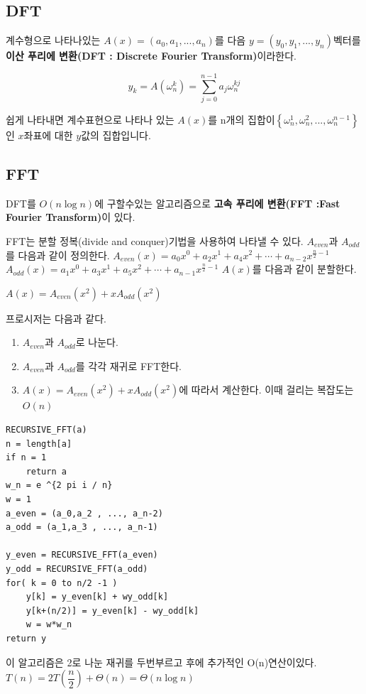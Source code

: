 \subsection{DFT}

계수형으로 나타나있는 $A(x) = (a_0,a_1,...,a_n)$를 다음 $y = (y_0,y_1,...,y_n) $벡터를 \textbf{이산 푸리에 변환(DFT : Discrete Fourier Transform)}이라한다.

$$ y_k = A(\omega^k_n) = \sum_{j=0}^{n-1} a_j\omega_{n}^{kj}$$

쉽게 나타내면 계수표현으로 나타나 있는 $A(x)$를 n개의 집합이$\left\{\omega_n^1, \omega_n^2 , ... , \omega_n^{n-1}\right\}$인 $x$좌표에 대한 $y$값의 집합입니다.

\subsection{FFT}
DFT를 $O(n \log n)$에 구할수있는 알고리즘으로 \textbf{고속 푸리에 변환(FFT :Fast Fourier Transform)}이 있다. 

FFT는 분할 정복(divide and conquer)기법을 사용하여 나타낼 수 있다.
$A_{even}$과 $A_{odd}$를 다음과 같이 정의한다.
$A_{even}(x) = a_0x^0 + a_2x^1 + a_4x^2 + \cdots + a_{n-2}x^{ \frac{n}{2}-1} $
$A_{odd}(x) = a_1x^0 + a_3x^1 + a_5x^2 + \cdots + a_{n-1}x^{\frac{n}{2}-1} $
$A(x)$를 다음과 같이 분할한다.

$A(x) = A_{even}(x^2) + xA_{odd}(x^2) $

프로시저는 다음과 같다.
\begin{enumerate}
    \item $A_{even}$과 $A_{odd}$로 나눈다.
    \item $A_{even}$과 $A_{odd}$를 각각 재귀로 FFT한다.
    \item $A(x) = A_{even}(x^2) + xA_{odd}(x^2) $에 따라서 계산한다. 이때 걸리는 복잡도는 $O(n)$
\end{enumerate}


\begin{lstlisting}[style = CStyle]
RECURSIVE_FFT(a)
n = length[a]
if n = 1
    return a
w_n = e ^{2 pi i / n}
w = 1
a_even = (a_0,a_2 , ..., a_n-2)
a_odd = (a_1,a_3 , ..., a_n-1)

y_even = RECURSIVE_FFT(a_even)
y_odd = RECURSIVE_FFT(a_odd)
for( k = 0 to n/2 -1 )
    y[k] = y_even[k] + wy_odd[k]
    y[k+(n/2)] = y_even[k] - wy_odd[k]
    w = w*w_n
return y
\end{lstlisting}

이 알고리즘은 2로 나눈 재귀를 두번부르고 후에 추가적인 O(n)연산이있다.
$T(n) = 2T\left(\dfrac{n}{2}\right) + \Theta(n) = \Theta(n \log n)$

